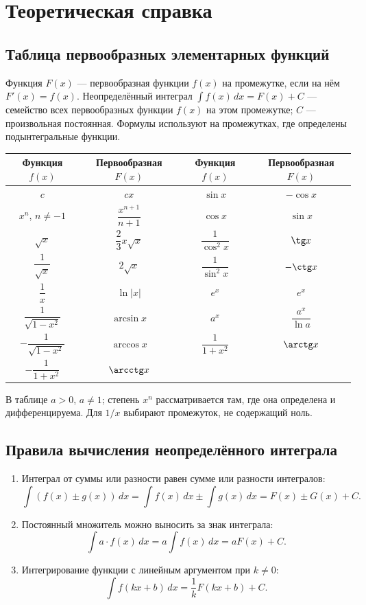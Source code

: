 \section*{Теоретическая справка}
\subsection*{Таблица первообразных элементарных функций}
Функция $F(x)$ --- первообразная функции $f(x)$ на промежутке, если на нём $F'(x)=f(x)$. Неопределённый интеграл $\int f(x)\,dx=F(x)+C$ --- семейство всех первообразных функции $f(x)$ на этом промежутке; $C$ --- произвольная постоянная. Формулы используют на промежутках, где определены подынтегральные функции.

\begin{center}
\renewcommand{\arraystretch}{1.35}
\begin{tabular}{c|c@{\qquad}c|c}
Функция $f(x)$ & Первообразная $F(x)$ & Функция $f(x)$ & Первообразная $F(x)$ \\ \hline
$c$ & $cx$ & $\sin x$ & $-\cos x$ \\
$x^n$, $n\ne-1$ & $\dfrac{x^{n+1}}{n+1}$ & $\cos x$ & $\sin x$ \\
$\sqrt{x}$ & $\dfrac{2}{3}x\sqrt{x}$ & $\dfrac{1}{\cos^{2}x}$ & $\tg x$ \\
$\dfrac{1}{\sqrt{x}}$ & $2\sqrt{x}$ & $\dfrac{1}{\sin^{2}x}$ & $-\ctg x$ \\
$\dfrac{1}{x}$ & $\ln|x|$ & $e^x$ & $e^x$ \\
$\dfrac{1}{\sqrt{1-x^2}}$ & $\arcsin x$ & $a^x$ & $\dfrac{a^x}{\ln a}$ \\
$-\dfrac{1}{\sqrt{1-x^2}}$ & $\arccos x$ & $\dfrac{1}{1+x^2}$ & $\arctg x$ \\
$-\dfrac{1}{1+x^2}$ & $\arcctg x$ & &
\end{tabular}
\end{center}

В таблице $a>0$, $a\ne1$; степень $x^n$ рассматривается там, где она определена и дифференцируема. Для $1/x$ выбирают промежуток, не содержащий ноль.

\subsection*{Правила вычисления неопределённого интеграла}
\begin{enumerate}
  \item Интеграл от суммы или разности равен сумме или разности интегралов:
  \[\int(f(x)\pm g(x))\,dx=\int f(x)\,dx\pm\int g(x)\,dx=F(x)\pm G(x)+C.\]
  \item Постоянный множитель можно выносить за знак интеграла:
  \[\int a\cdot f(x)\,dx=a\int f(x)\,dx=aF(x)+C.\]
  \item Интегрирование функции с линейным аргументом при $k\ne0$:
  \[\int f(kx+b)\,dx=\frac{1}{k}F(kx+b)+C.\]
\end{enumerate}

